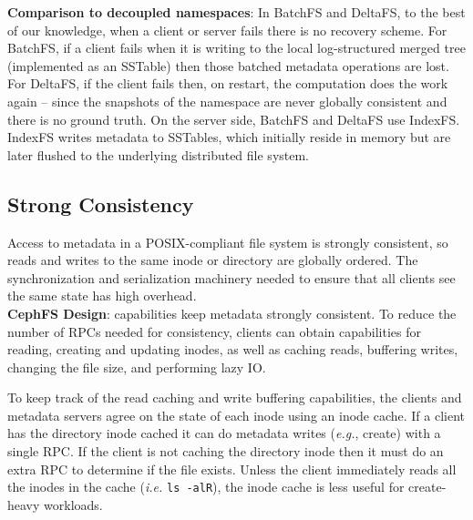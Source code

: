 \noindent\textbf{Comparison to decoupled namespaces}: In BatchFS and DeltaFS,
to the best of our knowledge, when a client or server fails there is no recovery
scheme. For BatchFS, if a client fails when it is writing to the local
log-structured merged tree (implemented as an SSTable) then those batched
metadata operations are lost. For DeltaFS, if the client fails then, on restart,
the computation does the work again -- since the snapshots of the namespace are
never globally consistent and there is no ground truth.  On the server side,
BatchFS and DeltaFS use IndexFS. IndexFS writes metadata to SSTables, which
initially reside in memory but are later flushed to the underlying
distributed file system.

\subsection{Strong Consistency}
\label{sec:strong-consistency}

Access to metadata in a POSIX-compliant file system is strongly consistent, so
reads and writes to the same inode or directory are globally ordered.  The
synchronization and serialization machinery needed to ensure that all clients
see the same state has high overhead.\\

\noindent\textbf{CephFS Design}: capabilities keep metadata strongly
consistent. To reduce the number of RPCs needed for consistency, clients can
obtain capabilities for reading, creating and updating inodes, as well as caching reads,
buffering writes, changing the file size, and performing lazy IO.

To keep track of the read caching and write buffering capabilities, the clients
and metadata servers agree on the state of each inode using an inode cache.  If
a client has the directory inode cached it can do metadata writes ({\it e.g.},
create) with a single RPC. If the client is not caching the directory inode
then it must do an extra RPC to determine if the file exists.  Unless the
client immediately reads all the inodes in the cache ({\it i.e.} \texttt{ls
-alR}), the inode cache is less useful for create-heavy workloads.

